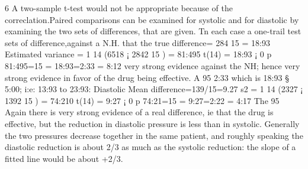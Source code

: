 \documentclass[a4paper,12pt]{article}
\begin{document}
6 A two-sample t-test would not be appropriate because of the correclation.Paired comparisons
can be examined for systolic and for diastolic by examining the two sets of differences,
that are given. Tn each case a one-trail test sets of difference,against a N.H. that the
true difference= 284
15 = 18:93
Estimated variance =
1
14
(6518 ¡
2842
15
) = 81:495
t(14) =
18:93 ¡ 0
p
81:495=15
= 18:93=2:33 = 8:12
very strong evidence against the NH; hence very strong evidence in favor of the drug being
effective.
A 95%
2:33 which is 18:93 § 5:00; i:e: 13:93 to 23:93:
Diastolic Mean difference=139/15=9.27
s2 =
1
14
(2327 ¡
1392
15
) = 74:210 t(14) =
9:27 ¡ 0
p
74:21=15
= 9:27=2:22 = 4:17
The 95%
Again there is very strong evidence of a real difference, ie that the drug is effective, but the
reduction in diastolic pressure is less than in systolic.
Generally the two pressures decrease together in the same patient, and roughly speaking
the diastolic reduction is about 2/3 as much as the systolic reduction: the slope of a fitted line
would be about +2/3.
\end{document}
